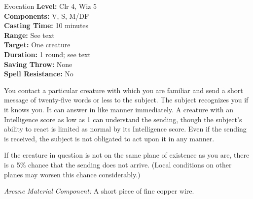 {Evocation}
{
	\textbf{Level:}
	Clr 4, Wiz 5\\
	\textbf{Components:}
	V, S, M/DF\\
	\textbf{Casting Time:}
	10 minutes\\
	\textbf{Range:}
	See text\\
	\textbf{Target:}
	One creature\\
	\textbf{Duration:}
	1 round; see text\\
	\textbf{Saving Throw:}
	None\\
	\textbf{Spell Resistance:}
	No\\
}
{
	You contact a particular creature with which you are familiar and send a short message of twenty-five words or less to the subject. The subject recognizes you if it knows you. It can answer in like manner immediately. A creature with an Intelligence score as low as 1 can understand the sending, though the subject's ability to react is limited as normal by its Intelligence score. Even if the sending is received, the subject is not obligated to act upon it in any manner.

	If the creature in question is not on the same plane of existence as you are, there is a 5\% chance that the sending does not arrive. (Local conditions on other planes may worsen this chance considerably.)

	\textit{Arcane Material Component:}
	A short piece of fine copper wire.

}
